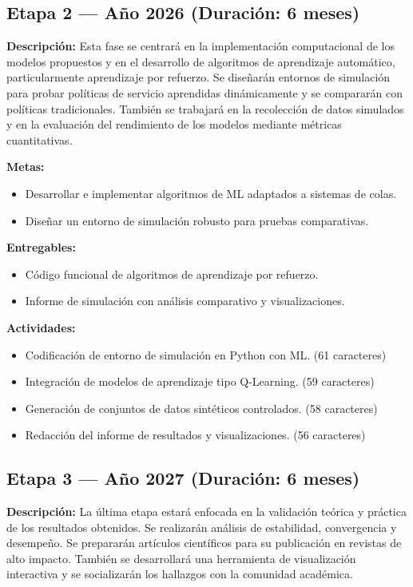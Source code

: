 \documentclass[12pt]{article}
\begin{document}
\subsection*{Etapa 2 — Año 2026 (Duración: 6 meses)}
\textbf{Descripción:} Esta fase se centrará en la implementación computacional de los modelos propuestos y en el desarrollo de algoritmos de aprendizaje automático, particularmente aprendizaje por refuerzo. Se diseñarán entornos de simulación para probar políticas de servicio aprendidas dinámicamente y se compararán con políticas tradicionales. También se trabajará en la recolección de datos simulados y en la evaluación del rendimiento de los modelos mediante métricas cuantitativas.

\textbf{Metas:}
\begin{itemize}
  \item Desarrollar e implementar algoritmos de ML adaptados a sistemas de colas.
  \item Diseñar un entorno de simulación robusto para pruebas comparativas.
\end{itemize}

\textbf{Entregables:}
\begin{itemize}
  \item Código funcional de algoritmos de aprendizaje por refuerzo.
  \item Informe de simulación con análisis comparativo y visualizaciones.
\end{itemize}

\textbf{Actividades:}
\begin{itemize}
  \item Codificación de entorno de simulación en Python con ML. (61 caracteres)
  \item Integración de modelos de aprendizaje tipo Q-Learning. (59 caracteres)
  \item Generación de conjuntos de datos sintéticos controlados. (58 caracteres)
  \item Redacción del informe de resultados y visualizaciones. (56 caracteres)
\end{itemize}

\subsection*{Etapa 3 — Año 2027 (Duración: 6 meses)}
\textbf{Descripción:} La última etapa estará enfocada en la validación teórica y práctica de los resultados obtenidos. Se realizarán análisis de estabilidad, convergencia y desempeño. Se prepararán artículos científicos para su publicación en revistas de alto impacto. También se desarrollará una herramienta de visualización interactiva y se socializarán los hallazgos con la comunidad académica.
\end{document}
